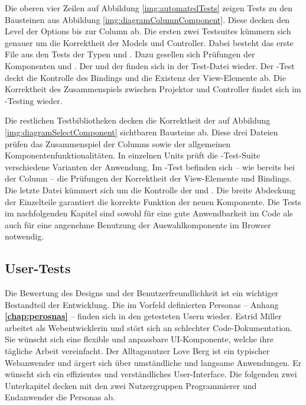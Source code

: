 Die oberen vier Zeilen auf Abbildung \ref{img:automatedTests} zeigen Tests zu den Bausteinen aus Abbildung \ref{img:diagramColumnComponent}. 
Diese decken den Level der Options bis zur Column ab. 
Die ersten zwei Testsuites kümmern sich genauer um die Korrektheit der Models und Controller. 
Dabei besteht das erste File aus den Tests der Typen  und . 
Dazu gesellen sich Prüfungen der Komponenten  und . 
Der  und der  finden sich in der Test-Datei wieder. 
Der -Test deckt die Kontrolle des Bindings und die Existenz der View-Elemente ab. 
Die Korrektheit des Zusammenspiels zwischen Projektor und Controller findet sich im -Testing wieder. 

Die restlichen Testbibliotheken decken die Korrektheit der auf Abbildung \ref{img:diagramSelectComponent} sichtbaren Bausteine ab. 
Diese drei Dateien prüfen das Zusammenspiel der Columns sowie der allgemeinen Komponentenfunktionalitäten. 
In einzelnen Units prüft die -Test-Suite verschiedene Varianten der Anwendung. 
Im -Test befinden sich – wie bereits bei der Column – die Prüfungen der Korrektheit der View-Elemente und Bindings. 
Die letzte Datei kümmert sich um die Kontrolle der  und . 
Die breite Abdeckung der Einzelteile garantiert die korrekte Funktion der neuen Komponente. 
Die Tests im nachfolgenden Kapitel sind sowohl für eine gute Anwendbarkeit im Code als auch für eine angenehme Benutzung der Auswahlkomponente im Browser notwendig. 


\subsection{User-Tests}
\label{sec:userTests}

Die Bewertung des Designs und der Benutzerfreundlichkeit ist ein wichtiger Bestandteil der Entwicklung. 
Die im Vorfeld definierten Personas – Anhang \textbf{\ref{chap:perosnas}} – finden sich in den getesteten Usern wieder. 
Estrid Miller arbeitet als Webentwicklerin und stört sich an schlechter Code-Dokumentation. 
Sie wünscht sich eine flexible und anpassbare UI-Komponente, welche ihre tägliche Arbeit vereinfacht. 
Der Alltagsnutzer Love Berg ist ein typischer Webanwender und ärgert sich über umständliche und langsame Anwendungen. 
Er wünscht sich ein effizientes und verständliches User-Interface. 
Die folgenden zwei Unterkapitel decken mit den zwei Nutzergruppen Programmierer und Endanwender die Personas ab. 


